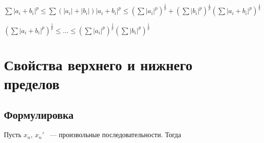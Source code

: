 \documentclass{article}
\begin{document}
            $\sum |a_i + b_i|^p \leq \sum ( |a_i| + |b_i| ) |a_i + b_i|^p \leq \left( \sum |a_i|^p \right)^{\frac{1}{p}} + \left( \sum |b_i|^p \right)^{\frac{1}{p}} (\sum |a_i + b_i|^p)^{\frac{1}{q}}$
            
            $\left( \sum |a_i + b_i|^p \right)^{\frac{1}{p}} \leq \ldots \leq \left( \sum |a_i|^p \right)^{\frac{1}{p}} \left( \sum |b_i|^p \right)^{\frac{1}{p}}$
            
    \newpage
    
    \section{Свойства верхнего и нижнего пределов}
    
        \subsection{Формулировка}
        
            Пусть $x_n$, $x_n'$ ~--- произвольные последовательности. Тогда
            
\end{document}
